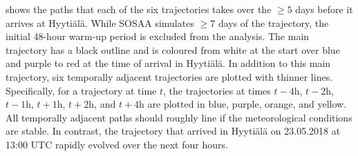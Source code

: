  shows the paths that each of the six trajectories takes over the $\geq 5$ days before it arrives at Hyyti\"al\"a. While SOSAA simulates $\geq 7$ days of the trajectory, the initial 48-hour warm-up period is excluded from the analysis. The main trajectory has a black outline and is coloured from white at the start over blue and purple to red at the time of arrival in Hyyti\"al\"a. In addition to this main trajectory, six temporally adjacent trajectories are plotted with thinner lines. Specifically, for a trajectory at time $t$, the trajectories at times $t-4\text{h}$, $t-2\text{h}$, $t-1\text{h}$, $t+1\text{h}$, $t+2\text{h}$, and $t+4\text{h}$ are plotted in blue, purple, orange, and yellow. All temporally adjacent paths should roughly line if the meteorological conditions are stable. In contrast, the trajectory that arrived in Hyyti\"al\"a on 23.05.2018 at 13:00 UTC rapidly evolved over the next four hours.

